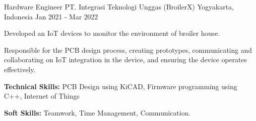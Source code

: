 

\begin{cventries}

  \cventry
    {Hardware Engineer} %
    {PT. Integrasi Teknologi Unggas (BroilerX)} %
    {Yogyakarta, Indonesia} %
    {Jan 2021 - Mar 2022} %
    {
      \begin{cvitems} %
        \item {Developed an IoT devices to monitor the environment of broiler house.}
        \item {Responsible for the PCB design process, creating prototypes, communicating and collaborating on IoT integration in the device, and ensuring the device operates effectively.}
        \item {\textbf{Technical Skills:} PCB Design using KiCAD, Firmware programming using C++, Internet of Things}
        \item {\textbf{Soft Skills:} Teamwork, Time Management, Communication.}
      \end{cvitems}
    }

\end{cventries}

